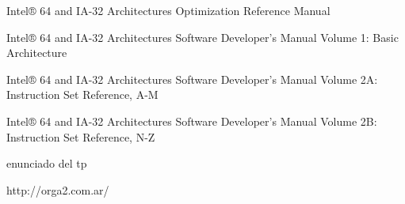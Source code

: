 Intel® 64 and IA-32 Architectures Optimization Reference Manual

Intel® 64 and IA-32 Architectures Software Developer's Manual
Volume 1: Basic Architecture

Intel® 64 and IA-32 Architectures Software Developer's Manual
Volume 2A: Instruction Set Reference, A-M

Intel® 64 and IA-32 Architectures Software Developer's Manual
Volume 2B: Instruction Set Reference, N-Z

enunciado del tp

http://orga2.com.ar/
